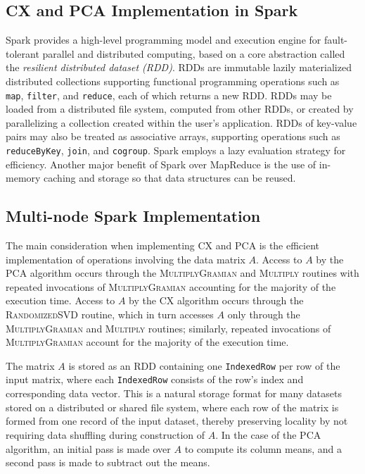 
\subsection{CX and PCA Implementation in Spark}

Spark provides a high-level programming model and execution engine for
fault-tolerant parallel and distributed computing, based on a core abstraction
called the \textit{resilient distributed dataset (RDD)}.  RDDs are immutable lazily
materialized distributed collections supporting functional programming
operations such as \texttt{map}, \texttt{filter}, and \texttt{reduce}, each of
which returns a new RDD.  RDDs may be loaded from a distributed file system,
computed from other RDDs, or created by parallelizing a collection created
within the user's application.  RDDs of key-value pairs may also be treated as
associative arrays, supporting operations such as \texttt{reduceByKey},
\texttt{join}, and \texttt{cogroup}.  Spark employs a lazy evaluation strategy
for efficiency.  Another major benefit of Spark over MapReduce is the use of
in-memory caching and storage so that data structures can be reused.

\subsection{Multi-node Spark Implementation}
\label{sec:cx_spark}
The main consideration when implementing CX and PCA is the efficient
implementation of operations involving the data matrix $A$.  Access to $A$ by
the PCA algorithm occurs through the \textsc{MultiplyGramian} and
\textsc{Multiply} routines with repeated invocations of
\textsc{MultiplyGramian} accounting for the majority of the execution time.
Access to $A$ by the CX algorithm occurs through the \textsc{RandomizedSVD}
routine, which in turn accesses $A$ only through the \textsc{MultiplyGramian}
and \textsc{Multiply} routines; similarly, repeated invocations of
\textsc{MultiplyGramian} account for the majority of the execution time.

The matrix $A$ is stored as an RDD containing one \texttt{IndexedRow} per row of the input matrix,
where each \texttt{IndexedRow} consists of the row's index and corresponding data vector.
This is a natural storage format for many datasets stored on a distributed or shared file
system, where each row of the matrix is formed from one record of the
input dataset, thereby preserving locality by not requiring data shuffling
during construction of $A$. In the case of the PCA algorithm, an initial pass is made over $A$ to compute
its column means, and a second pass is made to subtract out the means.

